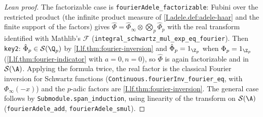 \begin{proof}[Lean proof]
The factorizable case is \texttt{fourierAdele\_factorizable}: Fubini over the restricted product (the infinite product measure of \cref{I.adele.def:adele-haar} and the finite support of the factors) gives $\hat\Phi=\hat\Phi_\infty\otimes\bigotimes_p\hat\Phi_p$ with the real transform identified with Mathlib's $\mathcal F$ (\texttt{integral\_schwartz\_mul\_exp\_eq\_fourier}). Then \texttt{key2}: $\hat\Phi_p\in\mathcal S(\Q_p)$ by \cref{I.lf.thm:fourier-inversion} and $\hat\Phi_p=1_{\Z_p}$ when $\Phi_p=1_{\Z_p}$ (\cref{I.lf.thm:fourier-indicator} with $a=0,n=0$), so $\hat\Phi$ is again factorizable and in $\mathcal S(\A)$. Applying the formula twice, the real factor is the classical Fourier inversion for Schwartz functions (\texttt{Continuous.fourierInv\_fourier\_eq}, with $\Phi_\infty(-x)$) and the $p$-adic factors are \cref{I.lf.thm:fourier-inversion}. The general case follows by \texttt{Submodule.span\_induction}, using linearity of the transform on $\mathcal S(\A)$ (\texttt{fourierAdele\_add}, \texttt{fourierAdele\_smul}).
\end{proof}

